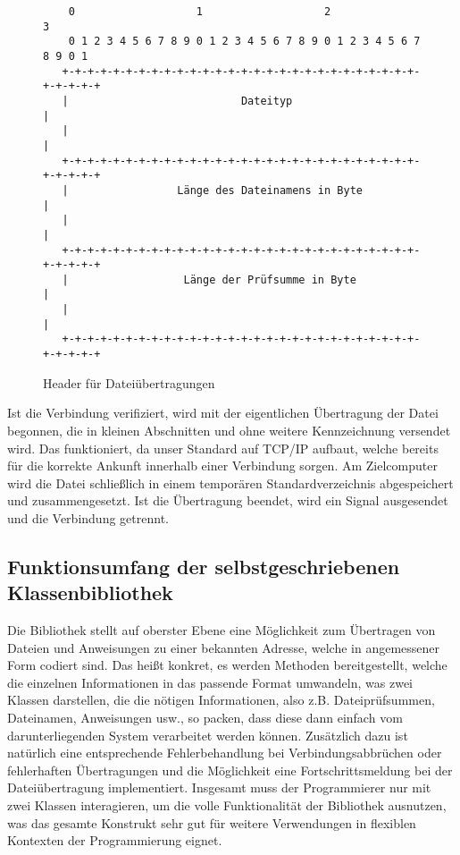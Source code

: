 \begin{figure}[h]
\begin{lstlisting}
	0                   1                   2                   3
    0 1 2 3 4 5 6 7 8 9 0 1 2 3 4 5 6 7 8 9 0 1 2 3 4 5 6 7 8 9 0 1
   +-+-+-+-+-+-+-+-+-+-+-+-+-+-+-+-+-+-+-+-+-+-+-+-+-+-+-+-+-+-+-+-+
   |                           Dateityp                            |
   |                                                               |
   +-+-+-+-+-+-+-+-+-+-+-+-+-+-+-+-+-+-+-+-+-+-+-+-+-+-+-+-+-+-+-+-+
   |                 Länge des Dateinamens in Byte                 |
   |                                                               |
   +-+-+-+-+-+-+-+-+-+-+-+-+-+-+-+-+-+-+-+-+-+-+-+-+-+-+-+-+-+-+-+-+
   |                  Länge der Prüfsumme in Byte                  |
   |                                                               |
   +-+-+-+-+-+-+-+-+-+-+-+-+-+-+-+-+-+-+-+-+-+-+-+-+-+-+-+-+-+-+-+-+
\end{lstlisting}
\caption{Header für Dateiübertragungen}
\label{Datei_Header}
\end{figure}

Ist die Verbindung verifiziert, wird mit der eigentlichen Übertragung der Datei begonnen, die in kleinen Abschnitten und ohne weitere Kennzeichnung versendet wird.
Das funktioniert, da unser Standard auf TCP/IP aufbaut, welche bereits für die korrekte Ankunft innerhalb einer Verbindung sorgen.
Am Zielcomputer wird die Datei schließlich in einem temporären Standardverzeichnis abgespeichert und zusammengesetzt.
Ist die Übertragung beendet, wird ein Signal ausgesendet und die Verbindung getrennt.

\subsection{Funktionsumfang der selbstgeschriebenen Klassenbibliothek}
Die Bibliothek stellt auf oberster Ebene eine Möglichkeit zum Übertragen von Dateien und Anweisungen zu einer bekannten Adresse, welche in angemessener Form codiert sind.
Das heißt konkret, es werden Methoden bereitgestellt, welche die einzelnen Informationen in das passende Format umwandeln, was zwei Klassen darstellen, die die nötigen Informationen, also z.B. Dateiprüfsummen, Dateinamen, Anweisungen usw., so packen, dass diese dann einfach vom darunterliegenden System verarbeitet werden können.
Zusätzlich dazu ist natürlich eine entsprechende Fehlerbehandlung bei Verbindungsabbrüchen oder fehlerhaften Übertragungen und die Möglichkeit eine Fortschrittsmeldung bei der Dateiübertragung implementiert.
Insgesamt muss der Programmierer nur mit zwei Klassen interagieren, um die volle Funktionalität der Bibliothek ausnutzen, was das gesamte Konstrukt sehr gut für weitere Verwendungen in flexiblen Kontexten der Programmierung eignet.

